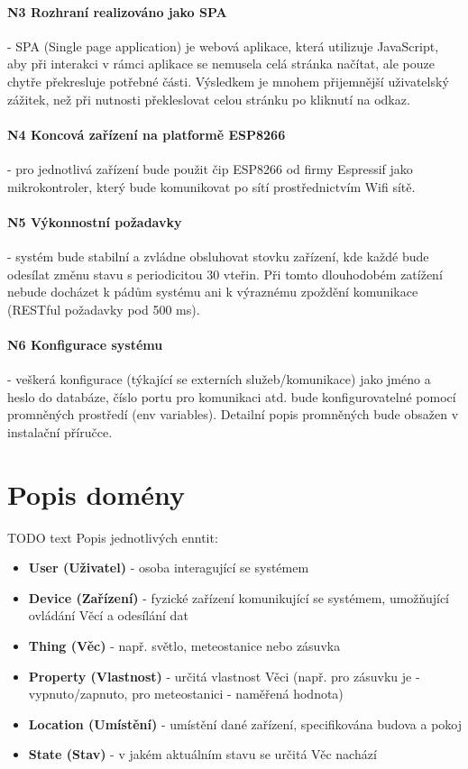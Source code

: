 \documentclass[thesis=B,czech]{FITthesis}[2019/12/23]
\begin{document}
\paragraph{N3 Rozhraní realizováno jako SPA}
- SPA (Single page application) je webová aplikace, která utilizuje JavaScript, aby při interakci v rámci aplikace se nemusela celá stránka načítat, ale pouze chytře překresluje potřebné části. Výsledkem je mnohem přijemnější uživatelský zážitek, než při nutnosti překleslovat celou stránku po kliknutí na odkaz.

\paragraph{N4 Koncová zařízení na platformě ESP8266}
- pro jednotlivá zařízení bude použit čip ESP8266 od firmy Espressif jako mikrokontroler, který bude komunikovat po sítí prostřednictvím Wifi sítě.

\paragraph{N5 Výkonnostní požadavky}
- systém bude stabilní a zvládne obsluhovat stovku zařízení, kde každé bude odesílat změnu stavu s periodicitou 30 vteřin. Při tomto dlouhodobém zatížení nebude docházet k pádům systému ani k výraznému zpoždění komunikace (RESTful požadavky pod 500 ms).

\paragraph{N6 Konfigurace systému} %
- veškerá konfigurace (týkající se externích služeb/komunikace) jako jméno a heslo do databáze, číslo portu pro komunikaci atd. bude konfigurovatelné pomocí promněných prostředí (env variables). Detailní popis promněných bude obsažen v instalační příručce.



\section{Popis domény}
TODO text
Popis jednotlivých enntit:
\begin{itemize}
    \item \textbf{User (Uživatel)} - osoba interagující se systémem
    \item \textbf{Device (Zařízení)} - fyzické zařízení komunikující se systémem, umožňující ovládání Věcí a odesílání dat
    \item \textbf{Thing (Věc)} - např. světlo, meteostanice nebo zásuvka
    \item \textbf{Property (Vlastnost)} - určitá vlastnost Věci (např. pro zásuvku je  - vypnuto/zapnuto, pro meteostanici  - naměřená hodnota)
    \item \textbf{Location (Umístění)} - umístění dané zařízení, specifikována budova a pokoj
    \item \textbf{State (Stav)} - v jakém aktuálním stavu se určitá Věc nachází
\end{itemize}
\end{document}
